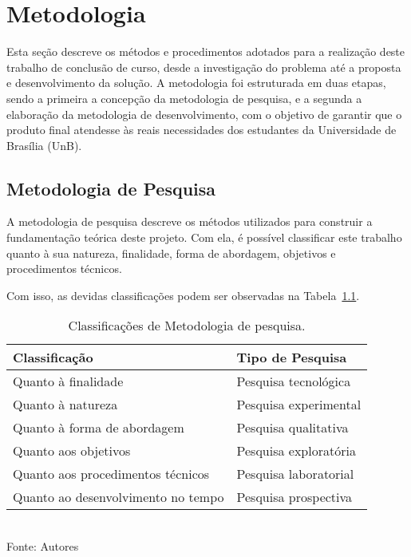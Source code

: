 \chapter[Metodologia]{Metodologia}

Esta seção descreve os métodos e procedimentos adotados para a realização deste trabalho de conclusão de curso, desde a investigação do problema até a proposta e desenvolvimento da solução. A metodologia foi estruturada em duas etapas, sendo a primeira a concepção da metodologia de pesquisa, e a segunda a elaboração da metodologia de desenvolvimento, com o objetivo de garantir que o produto final atendesse às reais necessidades dos estudantes da Universidade de Brasília (UnB).

\section{Metodologia de Pesquisa}

A metodologia de pesquisa descreve os métodos utilizados para construir a fundamentação teórica deste projeto. Com ela, é possível classificar este trabalho quanto à sua natureza, finalidade, forma de abordagem, objetivos e procedimentos técnicos.

Com isso, as devidas classificações podem ser observadas na Tabela~\ref{tab:tipo_pesquisa}.

\setlength{\extrarowheight}{5pt}

\begin{table}[H]
    \centering
    \caption{Classificações de Metodologia de pesquisa.}
    \begin{tabular}{|l|l|}
        \hline
        \textbf{Classificação}            & \textbf{Tipo de Pesquisa}\\ 
        \hline
        Quanto à finalidade               & Pesquisa tecnológica \\ 
        \hline
        Quanto à natureza                 & Pesquisa experimental \\ 
        \hline
        Quanto à forma de abordagem       & Pesquisa qualitativa \\
        \hline
        Quanto aos objetivos              & Pesquisa exploratória \\
        \hline
        Quanto aos procedimentos técnicos & Pesquisa laboratorial \\        
        \hline
        Quanto ao desenvolvimento no tempo & Pesquisa prospectiva \\
        \hline   
    \end{tabular}
    \label{tab:tipo_pesquisa}
    \vspace{5mm} \\ 
    {\footnotesize Fonte: Autores}
\end{table}

